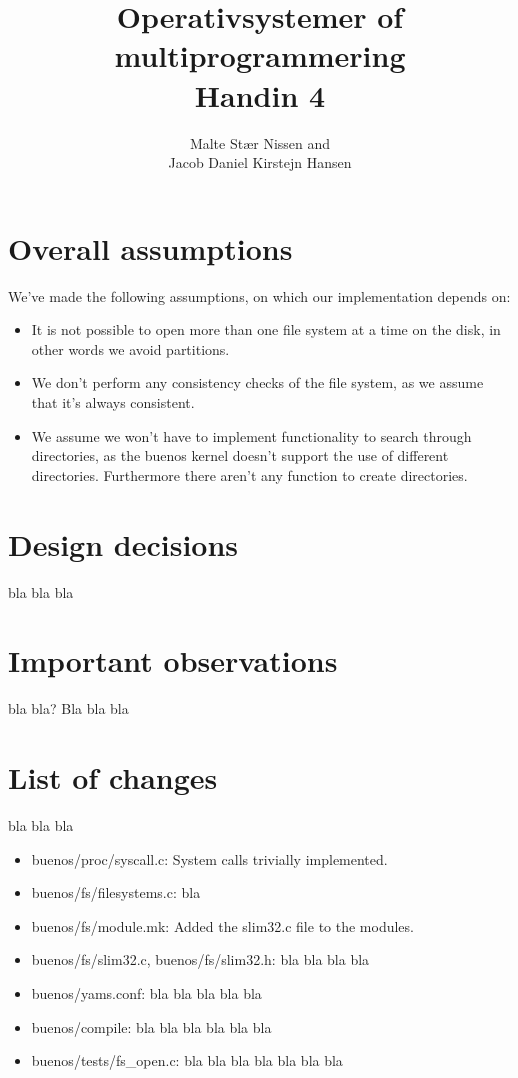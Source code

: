 \documentclass[11pt,a4paper]{article}
\title{Operativsystemer of multiprogrammering \\ Handin 4}
\author{Malte Stær Nissen and\\
        Jacob Daniel Kirstejn Hansen}
\begin{document}
\maketitle

\tableofcontents
\newpage

\section{Overall assumptions}
We've made the following assumptions, on which our implementation depends on:

\begin{itemize}
\item It is not possible to open more than one file system at a time on the
disk, in other words we avoid partitions.
\item We don't perform any consistency checks of the file system, as we assume
that it's always consistent.
\item We assume we won't have to implement functionality to search through
directories, as the buenos kernel doesn't support the use of different
directories. Furthermore there aren't any function to create directories.
\end{itemize}

\section{Design decisions}
bla bla bla 

\section{Important observations}
bla bla? Bla bla bla

\section{List of changes}
bla bla bla

\begin{itemize}
\item buenos/proc/syscall.c: System calls trivially implemented.
\item buenos/fs/filesystems.c: bla
\item buenos/fs/module.mk: Added the slim32.c file to the modules.
\item buenos/fs/slim32.c, buenos/fs/slim32.h: bla bla bla bla
\item buenos/yams.conf: bla bla bla bla bla
\item buenos/compile: bla bla bla bla bla bla
\item buenos/tests/fs\_open.c: bla bla bla bla bla bla bla 
\end{itemize}
\end{document}
